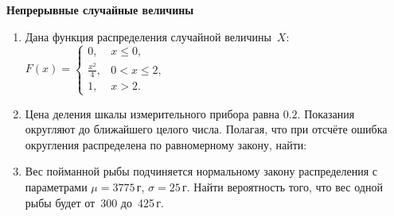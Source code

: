 \documentclass[a4paper,17pt]{extarticle}
\begin{document}
{\centering 
{
\bfseries Непрерывные случайные величины \par}
\begin{enumerate}
    \item Дана функция распределения случайной величины~$X$: 
    $F(x)= \begin{cases}
      0, & x \leqslant 0,\\
      \frac{x^2}{4}, & 0< x \leqslant 2,\\
      1,  & x>2.
    \end{cases}
    $
    
    \item Цена деления шкалы измерительного прибора равна $0.2$. Показания округляют до ближайшего целого числа. Полагая, что при отсчёте ошибка округления распределена по равномерному закону, найти: 
    
    
    \item Вес пойманной рыбы подчиняется нормальному закону распределения с параметрами $\mu = 3775$\,г, $\sigma=25$\,г. 
    Найти вероятность того, что вес одной рыбы будет от~300 до~425\,г.
    

\end{enumerate}}
\end{document}
